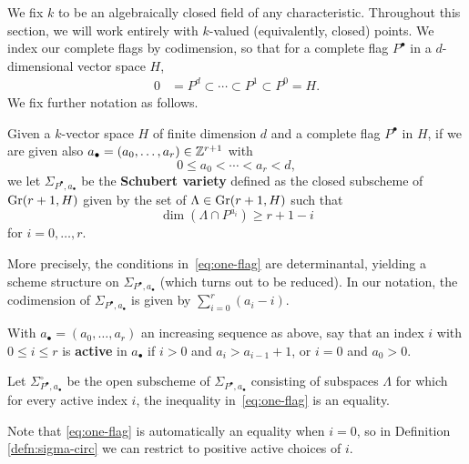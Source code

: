 \documentclass{amsart}
\begin{document}
We fix $k$ to be an algebraically closed field of any characteristic. 
Throughout this section, we will work entirely with $k$-valued (equivalently,
closed) points. 
We index our complete flags by codimension, so that for a complete flag $P^\bullet$ in a $d$-dimensional vector space $H$,
\begin{align*}
0 &= P^d \subset \cdots \subset P^1 \subset P^0 = H.
\end{align*} We fix further notation as
follows.



\begin{defn}\label{defn:schubert}
Given a $k$-vector space $H$ of finite dimension $d$ and 
a complete flag $P^{\bullet}$ in $H$, if we are given also
$a_{\bullet} = (a_0,\ldots,a_r)\in {\mathbb Z}^{r+1}$ 
with $$0 \le a_0 < \cdots < a_r < d,$$
we let $\Sigma_{P^{\bullet}, a_{\bullet}}$ be the \textbf{Schubert variety} 
defined as the closed subscheme of $\operatorname{Gr}(r+1,H)$ given by the set of 
$\Lambda \in \operatorname{Gr}(r+1,H)$ such that
\begin{equation}\label{eq:one-flag}
\dim (\Lambda\cap P^{a_i}) 
\ge r+1-i
\end{equation}
for $i=0,\ldots,r$.
\end{defn}

More precisely, the conditions in~\eqref{eq:one-flag} are determinantal, 
yielding a scheme structure on $\Sigma_{P^{\bullet},a_{\bullet}}$ (which turns out
to be reduced). In our notation, the codimension of $\Sigma_{P^{\bullet},a_{\bullet}}$
is given by $\sum_{i=0}^r (a_i\!-\!i)$.


\begin{defn}\label{defn:active}
With $a_{\bullet} = (a_0,\ldots , a_r)$ an increasing sequence as above, say that an index $i$ with $0\le i\le r$ is \textbf{active} in $a_{\bullet}$ if $i>0$ and 
$a_i > a_{i-1} + 1$, or $i=0$ and $a_0 >0.$
\end{defn}

\begin{defn}\label{defn:sigma-circ}
Let ${\Sigma}^\circ_{P^{\bullet},a_{\bullet}}$ be the open 
subscheme of 
$\Sigma_{P^{\bullet},a_{\bullet}}$ consisting of subspaces $\Lambda$ for which for every active index $i$, the 
inequality in~\eqref{eq:one-flag} is an equality. 
\end{defn}

\noindent Note that \eqref{eq:one-flag} is automatically an equality when $i=0$, so
in Definition \ref{defn:sigma-circ} we can restrict to positive active 
choices of $i$.
\end{document}
